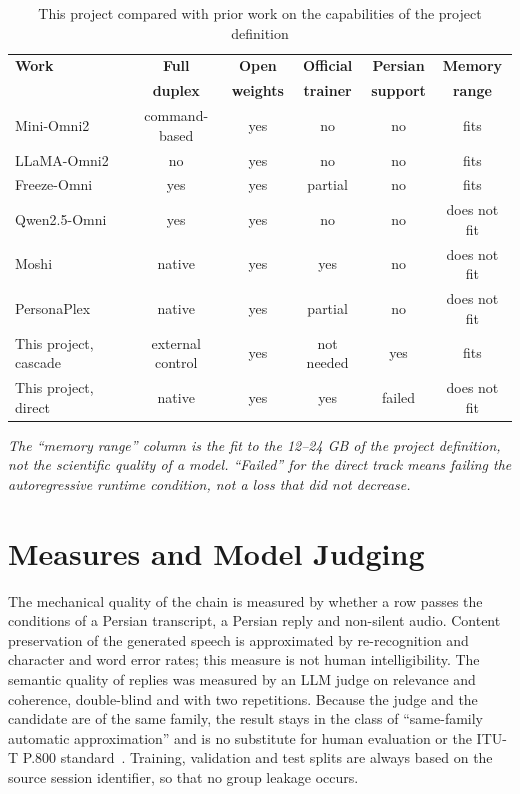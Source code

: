 \begin{table}[ht]
\centering
\caption{This project compared with prior work on the capabilities of the project definition}
\label{tab:positioning}
\small
\begin{tabular}{L{2.9cm}ccccc}
\toprule
\textbf{Work} & \textbf{Full} & \textbf{Open} & \textbf{Official} &
\textbf{Persian} & \textbf{Memory} \\
              & \textbf{duplex} & \textbf{weights} & \textbf{trainer} &
\textbf{support} & \textbf{range} \\
\midrule
Mini-Omni2   & command-based & yes & no & no & fits \\
LLaMA-Omni2  & no & yes & no & no & fits \\
Freeze-Omni  & yes & yes & partial & no & fits \\
Qwen2.5-Omni & yes & yes & no & no & does not fit \\
Moshi        & native & yes & yes & no & does not fit \\
PersonaPlex  & native & yes & partial & no & does not fit \\
\midrule
This project, cascade & external control & yes & not needed & yes & fits \\
This project, direct  & native & yes & yes & failed & does not fit \\
\bottomrule
\end{tabular}

\vspace{0.5em}
{\footnotesize\itshape The ``memory range'' column is the fit to the 12--24 GB of
the project definition, not the scientific quality of a model. ``Failed'' for
the direct track means failing the autoregressive runtime condition, not a loss
that did not decrease.\par}
\end{table}

\section{Measures and Model Judging}

The mechanical quality of the chain is measured by whether a row passes the
conditions of a Persian transcript, a Persian reply and non-silent audio.
Content preservation of the generated speech is approximated by
re-recognition and character and word error rates; this measure is not human
intelligibility. The semantic quality of replies was measured by an LLM judge
on relevance and coherence, double-blind and with two repetitions. Because the
judge and the candidate are of the same family, the result stays in the class
of ``same-family automatic approximation'' and is no substitute for human
evaluation or the ITU-T P.800 standard~\cite{itu1996p800}. Training,
validation and test splits are always based on the source session identifier,
so that no group leakage occurs.
